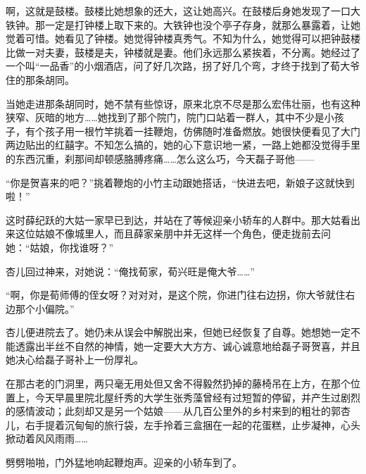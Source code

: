 \par 啊，这就是鼓楼。鼓楼比她想象的还大，这让她高兴。在鼓楼后身她发现了一口大铁钟。那一定是打钟楼上取下来的。大铁钟也没个亭子存身，就那么暴露着，让她觉着可惜。她看见了钟楼。她觉得钟楼真秀气。不知为什么，她觉得可以把钟鼓楼比做一对夫妻，鼓楼是夫，钟楼就是妻。他们永远那么紧挨着，不分离。她经过了一个叫“一品香”的小烟酒店，问了好几次路，拐了好几个弯，才终于找到了荀大爷住的那条胡同。
\par 当她走进那条胡同时，她不禁有些惊讶，原来北京不尽是那么宏伟壮丽，也有这种狭窄、灰暗的地方……她找到了那个院门，院门口站着一群人，其中不少是小孩子，有个孩子用一根竹竿挑着一挂鞭炮，仿佛随时准备燃放。她很快便看见了大门两边贴出的红囍字。不知怎么搞的，她的心下意识地一紧，一路上她都没觉得手里的东西沉重，刹那间却顿感胳膊疼痛……怎么这么巧，今天磊子哥他——
\par “你是贺喜来的吧？”挑着鞭炮的小竹主动跟她搭话，“快进去吧，新娘子这就快到啦！”
\par 这时薛纪跃的大姑一家早已到达，并站在了等候迎亲小轿车的人群中。那大姑看出来这位姑娘不像城里人，而且薛家亲朋中并无这样一个角色，便走拢前去问她：“姑娘，你找谁呀？”
\par 杏儿回过神来，对她说：“俺找荀家，荀兴旺是俺大爷……”
\par “啊，你是荀师傅的侄女呀？对对对，是这个院，你进门往右边拐，你大爷就住右边那个小偏院。”
\par 杏儿便进院去了。她仍未从误会中解脱出来，但她已经恢复了自尊。她想她一定不能透露出半丝不自然的神情，她一定要大大方方、诚心诚意地给磊子哥贺喜，并且她决心给磊子哥补上一份厚礼。
\par 在那古老的门洞里，两只毫无用处但又舍不得毅然扔掉的藤椅吊在上方，在那个位置上，今天早晨里院北屋纤秀的大学生张秀藻曾经有过短暂的停留，并产生过剧烈的感情波动；此刻却又是另一个姑娘——从几百公里外的乡村来到的粗壮的郭杏儿，右手提着沉甸甸的旅行袋，左手拎着三盒捆在一起的花蛋糕，止步凝神，心头掀动着风风雨雨……
\par 劈劈啪啪，门外猛地响起鞭炮声。迎亲的小轿车到了。


